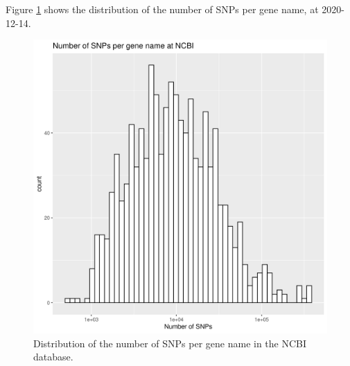



Figure \ref{fig:snps_per_gene_name_ncbi} shows the distribution of the
number of SNPs per gene name, at 2020-12-14.

\begin{figure}[!htbp]
  \includegraphics[width=\textwidth]{ncbi_peregrine_results/fig_snps_per_gene_name_ncbi.png}
  \caption{
    Distribution of the number of SNPs per gene name in the NCBI database.
  }
  \label{fig:snps_per_gene_name_ncbi}
\end{figure}

